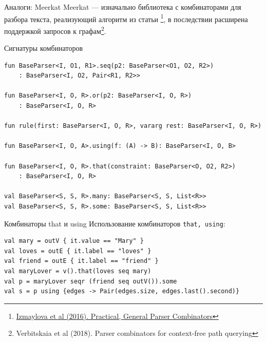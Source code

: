 \documentclass[aspectratio=169]{beamer}
\begin{document}
\appendix


\begin{frame}{Аналоги: Meerkat}
  Meerkat --- изначально библиотека с комбинаторами для разбора текста, реализующий алгоритм из статьи \footnote[1]{\href{https://dl.acm.org/doi/10.1145/2847538.2847539}
    {Izmaylova et al (2016). Practical, General Parser Combinators}}, в последствии расширена поддержкой запросов к графам\footnote{Verbitskaia et al (2018). Parser combinators for context-free path querying}.

\end{frame}

\begin{frame}[fragile]{Сигнатуры комбинаторов}

  \begin{verbatim}
fun BaseParser<I, O1, R1>.seq(p2: BaseParser<O1, O2, R2>)
    : BaseParser<I, O2, Pair<R1, R2>>

fun BaseParser<I, O, R>.or(p2: BaseParser<I, O, R>)
    : BaseParser<I, O, R>

fun rule(first: BaseParser<I, O, R>, vararg rest: BaseParser<I, O, R>)

fun BaseParser<I, O, A>.using(f: (A) -> B): BaseParser<I, O, B>

fun BaseParser<I, O, R>.that(constraint: BaseParser<O, O2, R2>)
    : BaseParser<I, O, R> 
    
val BaseParser<S, S, R>.many: BaseParser<S, S, List<R>>
val BaseParser<S, S, R>.some: BaseParser<S, S, List<R>>
\end{verbatim}
\end{frame}


\begin{frame}[fragile]{Комбинаторы that и using}
  Использование комбинаторов \texttt{that, using}:
  \begin{verbatim}
val mary = outV { it.value == "Mary" }
val loves = outE { it.label == "loves" }
val friend = outE { it.label == "friend" }
val maryLover = v().that(loves seq mary)
val p = maryLover seqr (friend seq outV()).some
val s = p using {edges -> Pair(edges.size, edges.last().second)}
\end{verbatim}
\end{frame}
\end{document}
